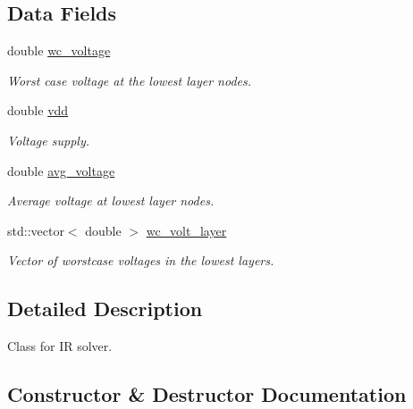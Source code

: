 \subsection*{Data Fields}
\begin{DoxyCompactItemize}
\item 
double \hyperlink{classIRSolver_aa994255bf8405bc13d0a887797b8bc42}{wc\+\_\+voltage}
\begin{DoxyCompactList}\small\item\em Worst case voltage at the lowest layer nodes. \end{DoxyCompactList}\item 
double \hyperlink{classIRSolver_acc781b74c7a8a7af351f55d06d00a922}{vdd}
\begin{DoxyCompactList}\small\item\em Voltage supply. \end{DoxyCompactList}\item 
double \hyperlink{classIRSolver_aa0336f80d573aecc0e6269d7f91441cc}{avg\+\_\+voltage}
\begin{DoxyCompactList}\small\item\em Average voltage at lowest layer nodes. \end{DoxyCompactList}\item 
std\+::vector$<$ double $>$ \hyperlink{classIRSolver_a06dc6ff621f8d90cea84fe74e1d9ffda}{wc\+\_\+volt\+\_\+layer}
\begin{DoxyCompactList}\small\item\em Vector of worstcase voltages in the lowest layers. \end{DoxyCompactList}\end{DoxyCompactItemize}


\subsection{Detailed Description}
Class for IR solver. 

\subsection{Constructor \& Destructor Documentation}
\mbox{\label{classIRSolver_ade5e2e1c97895d8e9c37141f62eccbd9}} 
